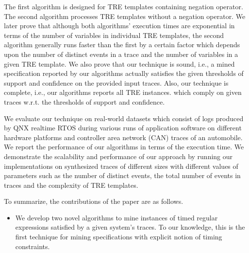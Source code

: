 \documentclass[]{sigplanconf}
\begin{document}
The first algorithm is designed for TRE templates containing negation operator. The second algorithm processes TRE templates without a negation operator. We later prove that although both algorithms' execution times are exponential in terms of the number of variables in individual TRE templates, the second algorithm generally runs faster than the first by a certain factor which depends upon the number of distinct events in a trace and the number of variables in a given TRE template. We also prove that our technique is sound, i.e., a mined specification reported by our algorithms actually satisfies the given thresholds of support and confidence on the provided input traces. Also, our technique is complete, i.e., our algorithms reports all TRE instances. which comply on given traces w.r.t. the thresholds of support and confidence.

We evaluate our technique on real-world datasets which consist of logs produced by QNX realtime RTOS during various runs of application software on different hardware platforms and controller area network (CAN) traces of an automobile. We report the performance of our algorithms in terms of the execution time. We demonstrate the scalability and performance of our approach by running our implementations on synthesized traces of different sizes with different values of parameters such as the number of distinct events, the total number of events in traces and the complexity of TRE templates.

To summarize, the contributions of the paper are as follows.
\begin{itemize}
\item We develop two novel algorithms to mine instances of timed regular expressions satisfied by a given system's traces. To our knowledge, this is the first technique for mining specifications with explicit notion of timing constraints.
\end{itemize}




\end{document}
